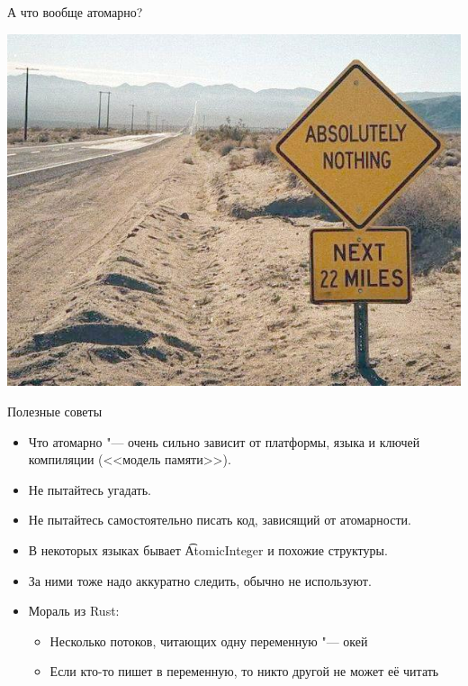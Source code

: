 \begin{frame}{А что вообще атомарно?}
	\begin{center}
		\includegraphics[scale=0.4]{absolutely-nothing.jpg}
	\end{center}
\end{frame}

\begin{frame}{Полезные советы}
	\begin{itemize}
		\item
			Что атомарно "--- очень сильно зависит от платформы, языка и ключей компиляции
			(<<модель памяти>>).
		\item Не пытайтесь угадать.
		\item Не пытайтесь самостоятельно писать код, зависящий от атомарности.
		\item В некоторых языках бывает \t{AtomicInteger} и похожие структуры.
		\item За ними тоже надо аккуратно следить, обычно не используют.
		\item Мораль из Rust:
			\begin{itemize}
			\item Несколько потоков, читающих одну переменную "--- окей
			\item Если кто-то пишет в переменную, то никто другой не может её читать
			\end{itemize}
	\end{itemize}
\end{frame}
